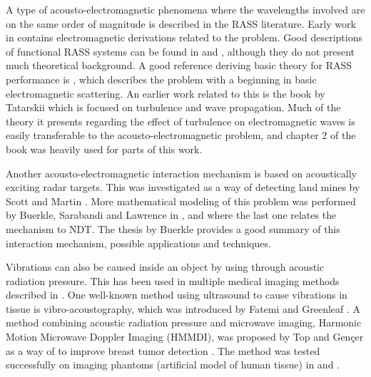 \documentclass[11pt,twoside]{eitExjobb}
\begin{document}
	A type of acousto-electromagnetic phenomena where the wavelengths involved are on the same order of magnitude is described in the RASS literature. Early work in \cite{Tonning1957} contains electromagnetic derivations related to the problem. Good descriptions of functional RASS systems can be found in \cite{Marshall1972} and \cite{May1990}, although they do not present much theoretical background. A good reference deriving basic theory for RASS performance is \cite{Gurvich1987}, which describes the problem with a beginning in basic electromagnetic scattering. An earlier work related to this is the book by Tatarskii \cite{Tatarskii1971} which is focused on turbulence and wave propagation. Much of the theory it presents regarding the effect of turbulence on electromagnetic waves is easily transferable to the acousto-electromagnetic problem, and chapter 2 of the book was heavily used for parts of this work.
	
	Another acousto-electromagnetic interaction mechanism is based on acoustically exciting radar targets. This was investigated as a way of detecting land mines by Scott and Martin \cite{Scott1999}. More mathematical modeling of this problem was performed by Buerkle, Sarabandi and Lawrence in \cite{Lawrence2001}, \cite{Buerkle2008} and \cite{Buerkle2009} where the last one relates the mechanism to NDT. The thesis by Buerkle \cite{Buerkle2007} provides a good summary of this interaction mechanism, possible applications and techniques.
	
	Vibrations can also be caused inside an object by using through acoustic radiation pressure. This has been used in multiple medical imaging methods described in \cite{Wang2018}. One well-known method using ultrasound to cause vibrations in tissue is vibro-acoustography, which was introduced by Fatemi and Greenleaf \cite{Fatemi1998}. A method combining acoustic radiation pressure and microwave imaging, Harmonic Motion Microwave Doppler Imaging (HMMDI), was proposed by Top and Gençer as a way of  to improve breast tumor detection \cite{Top2014}. The method was tested successfully on imaging phantoms (artificial model of human tissue) in \cite{Top2016} and \cite{Tafreshi2017}.
	
\end{document}
